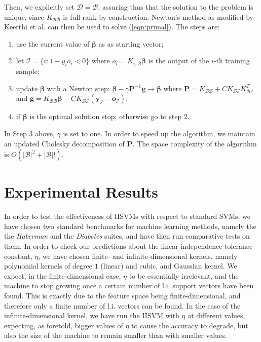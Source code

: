 \documentclass[10pt,twocolumn,letterpaper]{article}
\def\bb{\mathbf{\beta}}
\def\b{\mathcal{B}}
\def\d{\mathcal{D}}
\begin{document}
Then, we explicitly set $\d = \b$, assuring thus that the solution to
the problem is unique, since $K_{\b\b}$ is full rank by
construction. Newton's method as modified by Keerthi et
al. \cite{KeerthiDC05,KeerthiCDC06} can then be used to solve
(\ref{eqn:primal}). The steps are:

\begin{enumerate}

   \item use the current value of $\boldsymbol{\beta}$ as as starting
     vector;

   \item let $\mathcal{I} = \{ i: 1-y_i o_i<0 \}$ where $o_i =
     K_{i,\b} \bb$ is the output of the $i$-th training sample;

   \item update $\bb$ with a Newton step:
     $\bb - \gamma \mathbf{P}^{-1}\mathbf{g} \rightarrow \bb$ where
     $\mathbf{P} = K_{\b\b} + C K_{\b\mathcal{I}} K_{\b\mathcal{I}}^T$ and
     $\mathbf{g} = K_{\b\b} \bb - C K_{\b\mathcal{I}}
        \left( \mathbf{y}_{\mathcal{I}}-\mathbf{o}_{\mathcal{I}}\right)$;

   \item if $\bb$ is the optimal solution stop; otherwise go to step
     2.

\end{enumerate}

In Step $3$ above, $\gamma$ is set to one. In order to speed up the
algorithm, we maintain an updated Cholesky decomposition of
$\mathbf{P}$. The space complexity of the algorithm is
$O(|\b|^2+|\b|l)$.

\section{Experimental Results}
\label{sec:exp}

In order to test the effectiveness of IISVMs with respect to standard
SVMs, we have chosen two standard benchmarks for machine learning
methods, namely the the \emph{Haberman} and the \emph{Diabetes}
suites, and have then run comparative tests on them. In order to check
our predictions about the linear independence tolerance constant,
$\eta$, we have chosen finite- and infinite-dimensional kernels,
namely polynomial kernels of degree $1$ (linear) and cubic, and
Gaussian kernel. We expect, in the finite-dimensional case, $\eta$ to
be essentially irrelevant, and the machine to stop growing once a
certain number of l.i. support vectors have been found. This is
exactly due to the feature space being finite-dimensional, and
therefore only a finite number of l.i. vectors can be found. In the
case of the infinite-dimensional kernel, we have run the IISVM with
$\eta$ at different values, expecting, as foretold, bigger values of
$\eta$ to cause the accuracy to degrade, but also the size of the
machine to remain smaller than with smaller values.
\end{document}
